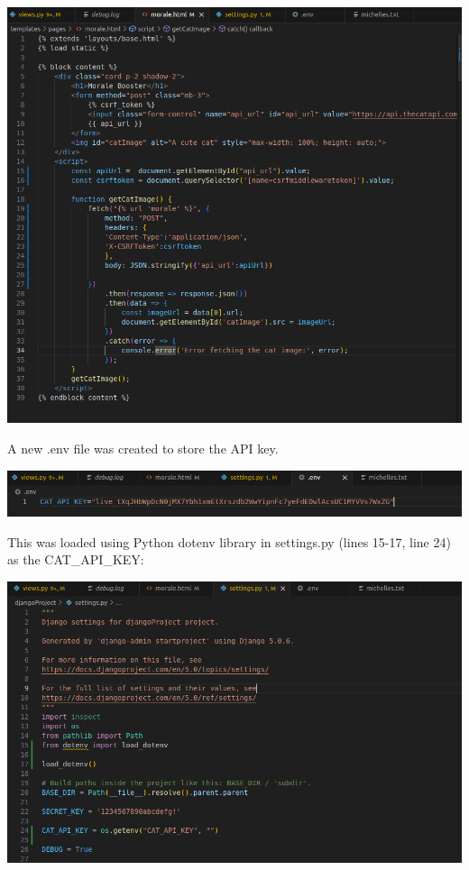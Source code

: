 \begin{center}
    \includegraphics[width = \linewidth]{images/Michelle/jschanges.png}
\end{center}

A new .env file was created to store the API key. 

\begin{center}
    \includegraphics[width = \linewidth]{images/Michelle/envfile.png}
\end{center}

This was loaded using Python dotenv library in settings.py (lines 15-17, line 24) as the CAT\_API\_KEY:

\begin{center}
    \includegraphics[width = \linewidth]{images/Michelle/APIkeyextraction.png}
\end{center}

